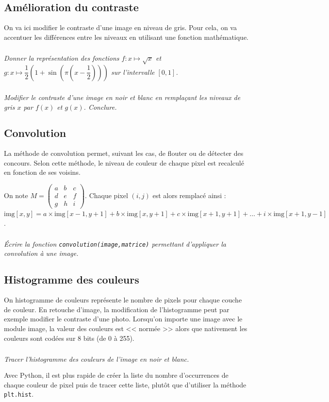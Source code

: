 \documentclass[10pt,fleqn]{article} %
\begin{document}
\begin{multicols}{2}
\subsection*{Amélioration du contraste}
On va ici modifier le contraste d'une image en niveau de gris. 
Pour cela, on va accentuer les différences entre les niveaux en utilisant une fonction mathématique. 

\subparagraph{}\textit{Donner la représentation des fonctions $f:x \mapsto \sqrt{x}$ et $g:x\mapsto \dfrac{1}{2}\left(1+\sin\left(\pi\left(x-\dfrac{1}{2}\right)\right)\right)$ sur l'intervalle $[0,1]$.}

\subparagraph{}\textit{Modifier le contraste d'une image en noir et blanc en remplaçant les niveaux de gris $x$ par $f(x)$ et $g(x)$. Conclure.}

\subsection*{Convolution}
La méthode de convolution permet, suivant les cas, de flouter ou de détecter des concours. 
Selon cette méthode, le niveau de couleur de chaque pixel est recalculé en fonction de ses voisins. 


On note $M=\begin{pmatrix} a & b & c \\ d & e & f \\ g & h & i \end{pmatrix}$. Chaque pixel $(i,j)$ est alors remplacé ainsi : $\text{img}[x, y] = a \times \text{img}[x-1, y+1] + b \times \text{img}[x, y+1]+ c \times \text{img}[x+1, y+1] + \ldots + i \times \text{img}[x+1, y-1]$.

\subparagraph{}\textit{Écrire la fonction \texttt{convolution(image,matrice)} permettant d'appliquer la convolution à une image.}


\subsection*{Histogramme des couleurs}
On histogramme de couleurs représente le nombre de pixels pour chaque couche de couleur. En retouche d'image, la modification de l'histogramme peut par exemple modifier le contraste d'une photo. 
Lorsqu'on importe une image avec le module image, la valeur des couleurs est << normée >> alors que nativement les couleurs sont codées sur 8 bits (de 0 à 255).  

\subparagraph{}\textit{Tracer l'histogramme des couleurs de l'image en noir et blanc.}

\begin{rem}
Avec Python, il est plus rapide de créer la liste du nombre d'occurrences de chaque couleur de pixel puis de tracer cette liste, plutôt que d'utiliser la méthode \texttt{plt.hist}.
\end{rem}

\ifprof
\else
\end{multicols}
\fi
\end{document}
